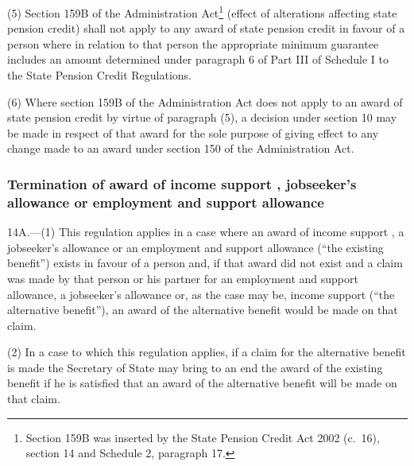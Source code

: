 \documentclass[12pt,a4paper]{article}
\begin{document}
(5) Section 159B of the Administration Act\footnote{Section 159B was inserted by the State Pension Credit Act 2002 (c.\ 16), section 14 and Schedule 2, paragraph 17.} (effect of alterations affecting state pension credit) shall not apply to any award of state pension credit in favour of a person where in relation to that person the appropriate minimum guarantee includes an amount determined under paragraph 6 of Part III of Schedule I to the State Pension Credit Regulations.

(6) Where section 159B of the Administration Act does not apply to an award of state pension credit by virtue of paragraph (5), a decision under section 10 may be made in respect of that award for the sole purpose of giving effect to any change made to an award under section 150 of the Administration Act.


\subsubsection[14A. Termination of award of income support%
, jobseeker’s allowance or employment and support allowance%
]{Termination of award of income support%
, jobseeker’s allowance or employment and support allowance%
}

14A.---(1)  This regulation applies in a case where an award of income support%
, a jobseeker’s allowance or an employment and support allowance  %
(“the existing benefit”) exists in favour of a person and, if that award did not exist and a claim was made by that person or his partner for 
an employment and support allowance,  %
a jobseeker’s allowance or, as the case may be, income support (“the alternative benefit”), an award of the alternative benefit would be made on that claim.

(2) In a case to which this regulation applies, if a claim for the alternative benefit is made the Secretary of State may bring to an end the award of the existing benefit if he is satisfied that an award of the alternative benefit will be made on that claim.
\end{document}
